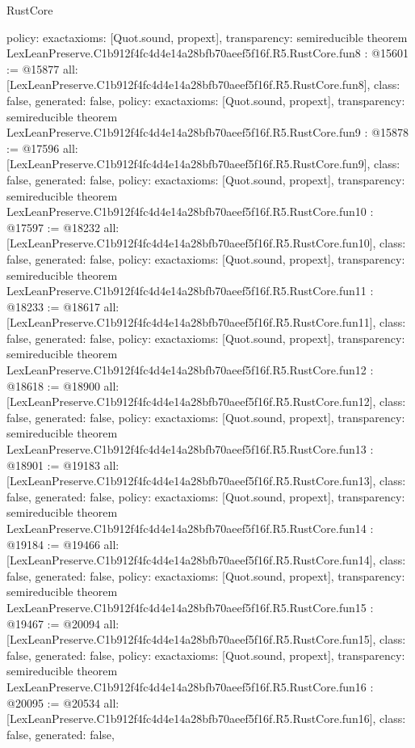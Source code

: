 \begin{lexlean}{RustCore}
\begin{coremodule}
{  policy: exact{axioms: [Quot.sound, propext]},
  transparency: semireducible
}
theorem LexLeanPreserve.C1b912f4fc4d4e14a28bfb70aeef5f16f.R5.RustCore.fun8 : @15601 := @15877 {
  all: [LexLeanPreserve.C1b912f4fc4d4e14a28bfb70aeef5f16f.R5.RustCore.fun8],
  class: false,
  generated: false,
  policy: exact{axioms: [Quot.sound, propext]},
  transparency: semireducible
}
theorem LexLeanPreserve.C1b912f4fc4d4e14a28bfb70aeef5f16f.R5.RustCore.fun9 : @15878 := @17596 {
  all: [LexLeanPreserve.C1b912f4fc4d4e14a28bfb70aeef5f16f.R5.RustCore.fun9],
  class: false,
  generated: false,
  policy: exact{axioms: [Quot.sound, propext]},
  transparency: semireducible
}
theorem LexLeanPreserve.C1b912f4fc4d4e14a28bfb70aeef5f16f.R5.RustCore.fun10 : @17597 := @18232 {
  all: [LexLeanPreserve.C1b912f4fc4d4e14a28bfb70aeef5f16f.R5.RustCore.fun10],
  class: false,
  generated: false,
  policy: exact{axioms: [Quot.sound, propext]},
  transparency: semireducible
}
theorem LexLeanPreserve.C1b912f4fc4d4e14a28bfb70aeef5f16f.R5.RustCore.fun11 : @18233 := @18617 {
  all: [LexLeanPreserve.C1b912f4fc4d4e14a28bfb70aeef5f16f.R5.RustCore.fun11],
  class: false,
  generated: false,
  policy: exact{axioms: [Quot.sound, propext]},
  transparency: semireducible
}
theorem LexLeanPreserve.C1b912f4fc4d4e14a28bfb70aeef5f16f.R5.RustCore.fun12 : @18618 := @18900 {
  all: [LexLeanPreserve.C1b912f4fc4d4e14a28bfb70aeef5f16f.R5.RustCore.fun12],
  class: false,
  generated: false,
  policy: exact{axioms: [Quot.sound, propext]},
  transparency: semireducible
}
theorem LexLeanPreserve.C1b912f4fc4d4e14a28bfb70aeef5f16f.R5.RustCore.fun13 : @18901 := @19183 {
  all: [LexLeanPreserve.C1b912f4fc4d4e14a28bfb70aeef5f16f.R5.RustCore.fun13],
  class: false,
  generated: false,
  policy: exact{axioms: [Quot.sound, propext]},
  transparency: semireducible
}
theorem LexLeanPreserve.C1b912f4fc4d4e14a28bfb70aeef5f16f.R5.RustCore.fun14 : @19184 := @19466 {
  all: [LexLeanPreserve.C1b912f4fc4d4e14a28bfb70aeef5f16f.R5.RustCore.fun14],
  class: false,
  generated: false,
  policy: exact{axioms: [Quot.sound, propext]},
  transparency: semireducible
}
theorem LexLeanPreserve.C1b912f4fc4d4e14a28bfb70aeef5f16f.R5.RustCore.fun15 : @19467 := @20094 {
  all: [LexLeanPreserve.C1b912f4fc4d4e14a28bfb70aeef5f16f.R5.RustCore.fun15],
  class: false,
  generated: false,
  policy: exact{axioms: [Quot.sound, propext]},
  transparency: semireducible
}
theorem LexLeanPreserve.C1b912f4fc4d4e14a28bfb70aeef5f16f.R5.RustCore.fun16 : @20095 := @20534 {
  all: [LexLeanPreserve.C1b912f4fc4d4e14a28bfb70aeef5f16f.R5.RustCore.fun16],
  class: false,
  generated: false,
}
\end{coremodule}
\end{lexlean}
